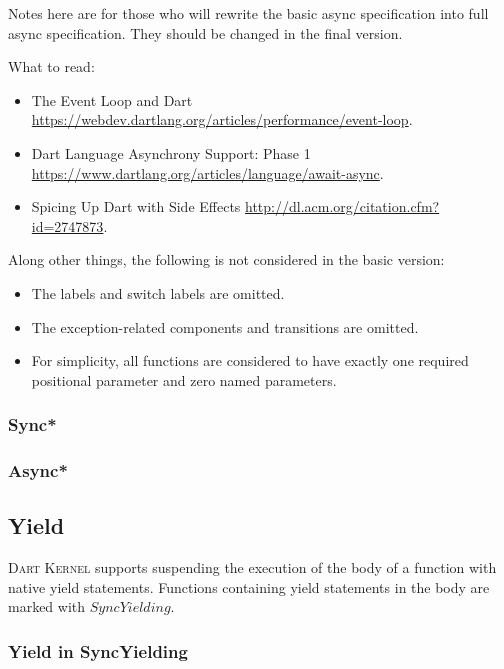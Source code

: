 \documentclass[a4paper,oneside,fleqn]{article}
\newcommand{\kernel}{\textsc{Dart Kernel}}
\begin{document}
Notes here are for those who will rewrite the basic async specification into full async specification.
They should be changed in the final version.

What to read:
\begin{itemize}
    \item The Event Loop and Dart \url{https://webdev.dartlang.org/articles/performance/event-loop}.

    \item Dart Language Asynchrony Support: Phase 1 \url{https://www.dartlang.org/articles/language/await-async}.

    \item Spicing Up Dart with Side Effects \url{http://dl.acm.org/citation.cfm?id=2747873}.

\end{itemize}

Along other things, the following is not considered in the basic version:
\begin{itemize}
    \item The labels and switch labels are omitted.

    \item The exception-related components and transitions are omitted.

    \item For simplicity, all functions are considered to have exactly one required positional parameter and zero named parameters.

\end{itemize}


\subsubsection{Sync*}
\label{subsubsec:syncstar}


\subsubsection{Async*}
\label{subsubsec:asyncstar}


\subsection{Yield}

\kernel{} supports suspending the execution of the body of a function with native yield statements.
Functions containing yield statements in the body are marked with $SyncYielding$.


\subsubsection{Yield in SyncYielding}
\label{subsubsec:yield-in-syncyelding}
\end{document}
